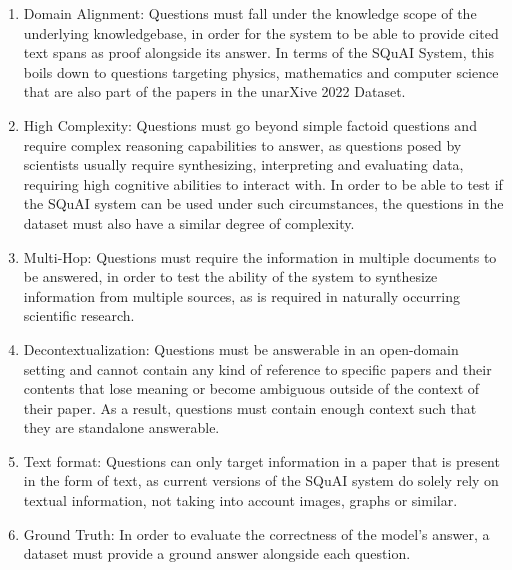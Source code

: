 \begin{enumerate}
    \item Domain Alignment: Questions must fall under the knowledge scope of the underlying knowledgebase, in order for the system to be able to provide cited text spans as proof alongside its answer. In terms of the SQuAI System, this boils down to questions targeting physics, mathematics and computer science that are also part of the papers in the unarXive 2022 Dataset.
    \item High Complexity: Questions must go beyond simple factoid questions and require complex reasoning capabilities to answer, as questions posed by scientists usually require synthesizing, interpreting and evaluating data, requiring high cognitive abilities to interact with. In order to be able to test if the SQuAI system can be used under such circumstances, the questions in the dataset must also have a similar degree of complexity.
    \item Multi-Hop: Questions must require the information in multiple documents to be answered, in order to test the ability of the system to synthesize information from multiple sources, as is required in naturally occurring scientific research.
    \item Decontextualization: Questions must be answerable in an open-domain setting and cannot contain any kind of reference to specific papers and their contents that lose meaning or become ambiguous outside of the context of their paper. As a result, questions must contain enough context such that they are standalone answerable.
    \item Text format: Questions can only target information in a paper that is present in the form of text, as current versions of the SQuAI system do solely rely on textual information, not taking into account images, graphs or similar. 
    \item Ground Truth: In order to evaluate the correctness of the model's answer, a dataset must provide a ground answer alongside each question.
\end{enumerate}

